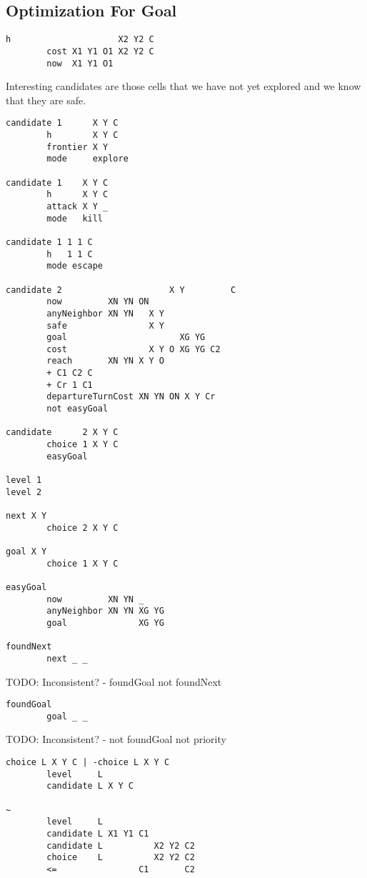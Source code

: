 \hypertarget{optimization-for-goal}{%
\subsection{Optimization For Goal}\label{optimization-for-goal}}

\begin{verbatim}
h                     X2 Y2 C
        cost X1 Y1 O1 X2 Y2 C
        now  X1 Y1 O1
\end{verbatim}

Interesting candidates are those cells that we have not yet explored and
we know that they are safe.

\begin{verbatim}
candidate 1      X Y C
        h        X Y C
        frontier X Y
        mode     explore

candidate 1    X Y C
        h      X Y C
        attack X Y _
        mode   kill

candidate 1 1 1 C
        h   1 1 C
        mode escape

candidate 2                     X Y         C
        now         XN YN ON
        anyNeighbor XN YN   X Y
        safe                X Y
        goal                      XG YG
        cost                X Y O XG YG C2
        reach       XN YN X Y O
        + C1 C2 C
        + Cr 1 C1
        departureTurnCost XN YN ON X Y Cr
        not easyGoal

candidate      2 X Y C
        choice 1 X Y C
        easyGoal

level 1
level 2

next X Y
        choice 2 X Y C

goal X Y
        choice 1 X Y C

easyGoal
        now         XN YN _
        anyNeighbor XN YN XG YG
        goal              XG YG

foundNext
        next _ _
\end{verbatim}

TODO: Inconsistent? - foundGoal not foundNext

\begin{verbatim}
foundGoal
        goal _ _
\end{verbatim}

TODO: Inconsistent? - not foundGoal not priority

\begin{verbatim}
choice L X Y C | -choice L X Y C
        level     L
        candidate L X Y C

~
        level     L
        candidate L X1 Y1 C1
        candidate L          X2 Y2 C2
        choice    L          X2 Y2 C2
        <=                C1       C2
\end{verbatim}


